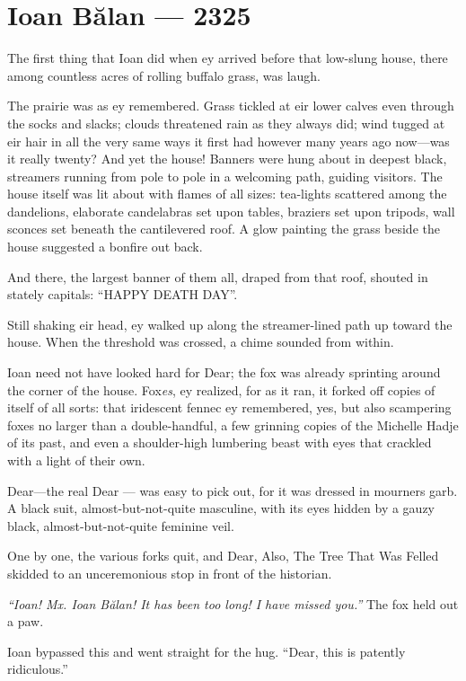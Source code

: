 \hypertarget{ioan-bux103lan-2325}{%
\chapter{Ioan Bălan — 2325}\label{ioan-bux103lan-2325}}

The first thing that Ioan did when ey arrived before that low-slung house, there among countless acres of rolling buffalo grass, was laugh.

The prairie was as ey remembered. Grass tickled at eir lower calves even through the socks and slacks; clouds threatened rain as they always did; wind tugged at eir hair in all the very same ways it first had however many years ago now---was it really twenty? And yet the house! Banners were hung about in deepest black, streamers running from pole to pole in a welcoming path, guiding visitors. The house itself was lit about with flames of all sizes: tea-lights scattered among the dandelions, elaborate candelabras set upon tables, braziers set upon tripods, wall sconces set beneath the cantilevered roof. A glow painting the grass beside the house suggested a bonfire out back.

And there, the largest banner of them all, draped from that roof, shouted in stately capitals: ``HAPPY DEATH DAY''.

Still shaking eir head, ey walked up along the streamer-lined path up toward the house. When the threshold was crossed, a chime sounded from within.

Ioan need not have looked hard for Dear; the fox was already sprinting around the corner of the house. Fox\emph{es}, ey realized, for as it ran, it forked off copies of itself of all sorts: that iridescent fennec ey remembered, yes, but also scampering foxes no larger than a double-handful, a few grinning copies of the Michelle Hadje of its past, and even a shoulder-high lumbering beast with eyes that crackled with a light of their own.

Dear---the real Dear — was easy to pick out, for it was dressed in mourners garb. A black suit, almost-but-not-quite masculine, with its eyes hidden by a gauzy black, almost-but-not-quite feminine veil.

One by one, the various forks quit, and Dear, Also, The Tree That Was Felled skidded to an unceremonious stop in front of the historian.

\emph{``Ioan! Mx. Ioan Bălan! It has been too long! I have missed you.''} The fox held out a paw.

Ioan bypassed this and went straight for the hug. ``Dear, this is patently ridiculous.''

